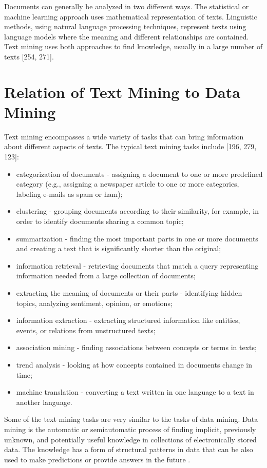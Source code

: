 \documentclass[11pt,openany,executivepaper]{book}
\begin{document}
Documents can generally be analyzed in two different ways. The statistical or machine learning approach uses mathematical representation of texts. Linguistic methods, using natural language processing techniques, represent texts using language models where the meaning and different relationships are contained. Text mining uses both approaches to find knowledge, usually in a large number of texts [254, 271].
\section{Relation of Text Mining to Data Mining}
Text mining encompasses a wide variety of tasks that can bring information about different aspects of texts. The typical text mining tasks include [196, 279, 123]:
\begin{itemize}
  \item categorization of documents - assigning a document to one or more predefined category (e.g., assigning a newspaper article to one or more categories, labeling e-mails as spam or ham);
  \item clustering - grouping documents according to their similarity, for example, in order to identify documents sharing a common topic;
  \item summarization - finding the most important parts in one or more documents and creating a text that is significantly shorter than the original;
  \item information retrieval - retrieving documents that match a query representing information needed from a large collection of documents;
  \item extracting the meaning of documents or their parts - identifying hidden topics, analyzing sentiment, opinion, or emotions;
  \item information extraction - extracting structured information like entities, events, or relations from unstructured texts;
  \item association mining - finding associations between concepts or terms in texts;
  \item trend analysis - looking at how concepts contained in documents change in time;
  \item machine translation - converting a text written in one language to a text in another language.
\end{itemize}
Some of the text mining tasks are very similar to the tasks of data mining. Data mining is the automatic or semiautomatic process of finding implicit, previously unknown, and potentially useful knowledge in collections of electronically stored data. The knowledge has a form of structural patterns in data that can be also used to make predictions or provide answers in the future \cite{280}.
\end{document}
